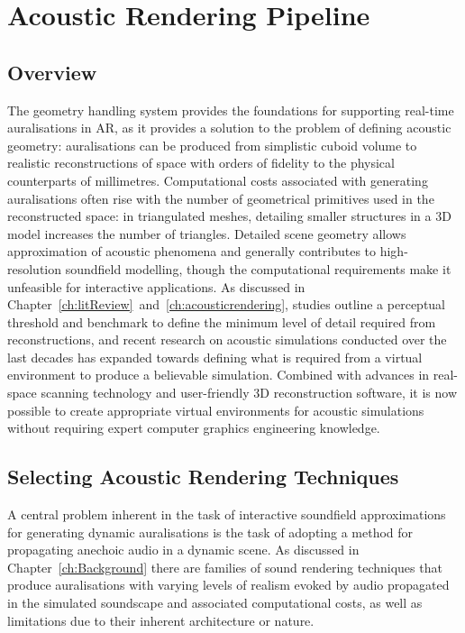 \section{Acoustic Rendering Pipeline}

\subsection{Overview}
The geometry handling system provides the foundations for supporting real-time auralisations in AR, as it provides a solution to the problem of defining acoustic geometry: auralisations can be produced from simplistic cuboid volume to realistic reconstructions of space with orders of fidelity to the physical counterparts of millimetres. Computational costs associated with generating auralisations often rise with the number of geometrical primitives used in the reconstructed space: in triangulated meshes, detailing smaller structures in a 3D model increases the number of triangles. Detailed scene geometry allows approximation of acoustic phenomena and generally contributes to high-resolution soundfield modelling, though the computational requirements make it unfeasible for interactive applications. As discussed in Chapter~\ref{ch:litReview}~and~\ref{ch:acousticrendering}, studies outline a perceptual threshold and benchmark to define the minimum level of detail required from reconstructions, and recent research on acoustic simulations conducted over the last decades has expanded towards defining what is required from a virtual environment to produce a believable simulation. Combined with advances in real-space scanning technology and user-friendly 3D reconstruction software, it is now possible to create appropriate virtual environments for acoustic simulations without requiring expert computer graphics engineering knowledge. \par

\subsection{Selecting Acoustic Rendering Techniques}
A central problem inherent in the task of interactive soundfield approximations for generating dynamic auralisations is the task of adopting a method for propagating anechoic audio in a dynamic scene. As discussed in Chapter~\ref{ch:Background} there are families of sound rendering techniques that produce auralisations with varying levels of realism evoked by audio propagated in the simulated soundscape and associated computational costs, as well as limitations due to their inherent architecture or nature.

